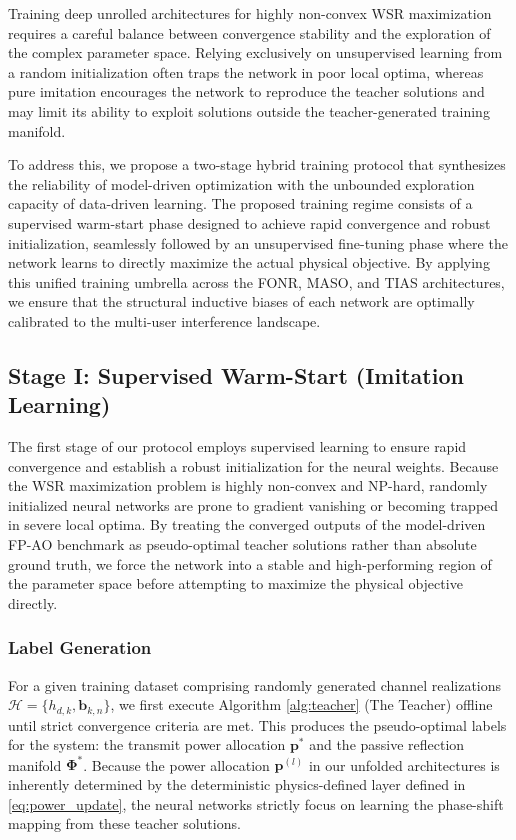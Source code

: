 \documentclass[journal]{IEEEtran}
\begin{document}
Training deep unrolled architectures for highly non-convex WSR maximization requires a careful balance between convergence stability and the exploration of the complex parameter space. Relying exclusively on unsupervised learning from a random initialization often traps the network in poor local optima, whereas pure imitation encourages the network to reproduce the teacher solutions and may limit its ability to exploit solutions outside the teacher-generated training manifold. 

To address this, we propose a two-stage hybrid training protocol that synthesizes the reliability of model-driven optimization with the unbounded exploration capacity of data-driven learning. The proposed training regime consists of a supervised warm-start phase designed to achieve rapid convergence and robust initialization, seamlessly followed by an unsupervised fine-tuning phase where the network learns to directly maximize the actual physical objective. By applying this unified training umbrella across the FONR, MASO, and TIAS architectures, we ensure that the structural inductive biases of each network are optimally calibrated to the multi-user interference landscape.

\subsection{Stage I: Supervised Warm-Start (Imitation Learning)}
\label{subsec:stage_1_supervised}

The first stage of our protocol employs supervised learning to ensure rapid convergence and establish a robust initialization for the neural weights. Because the WSR maximization problem is highly non-convex and NP-hard, randomly initialized neural networks are prone to gradient vanishing or becoming trapped in severe local optima. By treating the converged outputs of the model-driven FP-AO benchmark as pseudo-optimal teacher solutions rather than absolute ground truth, we force the network into a stable and high-performing region of the parameter space before attempting to maximize the physical objective directly.

\subsubsection{Label Generation}
For a given training dataset comprising randomly generated channel realizations $\mathcal{H} = \{ h_{d,k}, \mathbf{b}_{k,n} \}$, we first execute Algorithm \ref{alg:teacher} (The Teacher) offline until strict convergence criteria are met. This produces the pseudo-optimal labels for the system: the transmit power allocation $\mathbf{p}^*$ and the passive reflection manifold $\boldsymbol{\Phi}^*$. Because the power allocation $\mathbf{p}^{(l)}$ in our unfolded architectures is inherently determined by the deterministic physics-defined layer defined in \eqref{eq:power_update}, the neural networks strictly focus on learning the phase-shift mapping from these teacher solutions.
\end{document}
